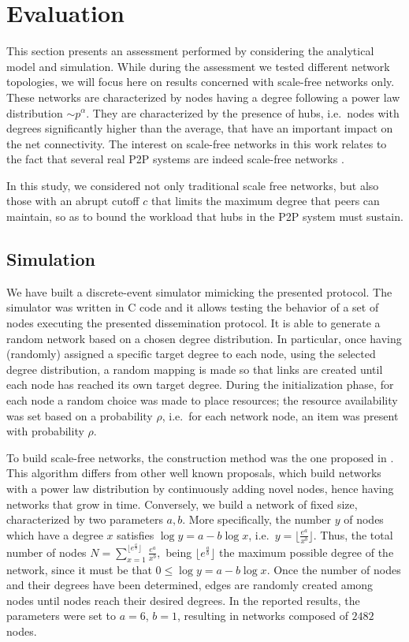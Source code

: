 \documentclass{sig-alternate}
\begin{document}
\section{Evaluation}\label{sec:exp}

This section presents an assessment performed by considering the analytical model and simulation. While during the assessment we tested different network topologies, we will focus here on results concerned with scale-free networks only.
These networks are characterized by nodes having a degree following a power law distribution $\sim p^\alpha$. 
They are characterized by the presence of hubs, i.e.~nodes with degrees significantly higher than the average, that have an important impact on the net connectivity.
The interest on scale-free networks in this work relates to the fact that several real \ac{P2P} systems are indeed scale-free networks \cite{simutools,newmanHandbook}.

In this study, we considered not only traditional scale free networks, but also those with an abrupt cutoff $c$ that limits the maximum degree that peers can maintain, so as to bound the workload that hubs in the P2P system must sustain. 

\subsection{Simulation}

We have built a discrete-event simulator mimicking the presented protocol. The simulator was written in C code and it allows testing the behavior of a set of nodes executing the presented dissemination protocol.
It is able to generate a random network based on a chosen degree distribution. In particular, once having (randomly) assigned a specific target degree to each node, using the selected degree distribution, a random mapping is made so that links are created until each node has reached its own target degree.
During the initialization phase, for each node a random choice was made to place resources; the resource availability was set based on a probability $\rho$, i.e.~for each network node, an item was present with probability $\rho$.

To build scale-free networks, the construction method was the one proposed in \cite{Aiello00arandom}.
This algorithm differs from other well known proposals, which build networks with a power law distribution by continuously adding novel nodes, hence having networks that grow in time. Conversely, we build a network of fixed size, characterized by two parameters $a, b$. 
More specifically, 
the number $y$ of nodes which have a degree $x$ satisfies $\log{y} = a - b \log{x}$, i.e.~$y = \lfloor\frac{e^a}{x^b}\rfloor$. 
Thus, the total number of nodes 
$N = \sum_{x=1}^{\lfloor e^{\frac{a}{b}}\rfloor} \frac{e^a}{x^b},$
being $\lfloor e^{\frac{a}{b}}\rfloor$ the maximum possible degree of the network, since it must be that $0 \leq \log{y} = a - b \log{x}$.
Once the number of nodes and their degrees have been determined, edges are randomly created among nodes until nodes reach their desired degrees.
In the reported results, the parameters were set to $a=6$, $b=1$, resulting in networks composed of $2482$ nodes. 
\end{document}
